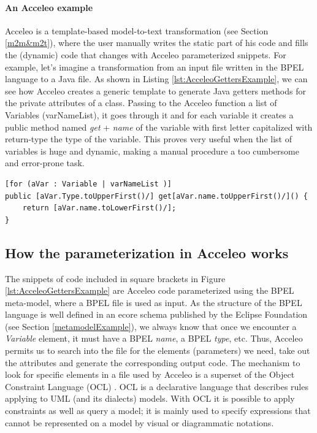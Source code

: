 \paragraph{An Acceleo example}
Acceleo is a template-based model-to-text transformation (see Section \ref{m2m&m2t}), where the user manually writes the static part of his code and fills the (dynamic) code that changes with Acceleo parameterized snippets.
For example, let's imagine a transformation from an input file written in the BPEL language to a Java file. As shown in Listing \ref{lst:AcceleoGettersExample}, we can see how Acceleo creates a generic template to generate Java getters methods for the private attributes of a class. Passing to the Acceleo function a list of Variables (varNameList), it goes through it and for each variable it creates a public method named \textit{get} + \textit{name} of the variable with first letter capitalized with return-type the type of the variable. This proves very useful when the list of variables is huge and dynamic, making a manual procedure a too cumbersome and error-prone task.

\begin{lstlisting}[caption={Acceleo creating the Java getters for a list of variables. The code out of square brackets is static code},label={lst:AcceleoGettersExample},mathescape]
[for (aVar : Variable | varNameList )]
public [aVar.Type.toUpperFirst()/] get[aVar.name.toUpperFirst()/]() {
	return [aVar.name.toLowerFirst()/];
}
\end{lstlisting}

\subsection{How the parameterization in Acceleo works}
The snippets of code included in square brackets in Figure \ref{lst:AcceleoGettersExample} are Acceleo code parameterized using the BPEL meta-model, where a BPEL file is used as input. As the structure of the BPEL language is well defined in an ecore schema published by the Eclipse Foundation (see Section \ref{metamodelExample}), we always know that once we encounter a \textit{Variable} element, it must have a BPEL \textit{name}, a BPEL \textit{type}, etc. 
Thus, Acceleo permits us to search into the file for the elements (parameters) we need, take out the attributes and generate the corresponding output code.
The mechanism to look for specific elements in a file used by Acceleo is a superset of the Object Constraint Language (OCL) \cite{UML20OCL}. OCL is a declarative language that describes rules applying to UML (and its dialects) models. With OCL it is possible to apply constraints as well as query a model; it is mainly used to specify expressions that cannot be represented on a model by visual or diagrammatic notations.

